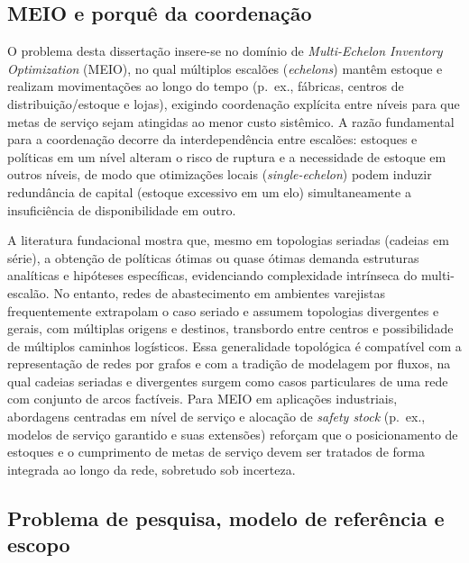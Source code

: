 \subsection{MEIO e porquê da coordenação}

O problema desta dissertação insere-se no domínio de \emph{Multi-Echelon Inventory Optimization} (MEIO), no qual múltiplos escalões (\emph{echelons}) mantêm estoque e realizam movimentações ao longo do tempo (p.\ ex., fábricas, centros de distribuição/estoque e lojas), exigindo coordenação explícita entre níveis para que metas de serviço sejam atingidas ao menor custo sistêmico. \cite{ClarkScarf1960MultiEchelon,Axsater2006InventoryControl,Zipkin2000FoundationsInventory} A razão fundamental para a coordenação decorre da interdependência entre escalões: estoques e políticas em um nível alteram o risco de ruptura e a necessidade de estoque em outros níveis, de modo que otimizações locais (\emph{single-echelon}) podem induzir redundância de capital (estoque excessivo em um elo) simultaneamente a insuficiência de disponibilidade em outro. \cite{SimchiLevi2009CadeiaSuprimentos,Chopra2022SCM}

A literatura fundacional mostra que, mesmo em topologias seriadas (cadeias em série), a obtenção de políticas ótimas ou quase ótimas demanda estruturas analíticas e hipóteses específicas, evidenciando complexidade intrínseca do multi-escalão. \cite{ClarkScarf1960MultiEchelon} No entanto, redes de abastecimento em ambientes varejistas frequentemente extrapolam o caso seriado e assumem topologias divergentes e gerais, com múltiplas origens e destinos, transbordo entre centros e possibilidade de múltiplos caminhos logísticos. Essa generalidade topológica é compatível com a representação de redes por grafos e com a tradição de modelagem por fluxos, na qual cadeias seriadas e divergentes surgem como casos particulares de uma rede com conjunto de arcos factíveis. \cite{AhujaMagnantiOrlin1993NetworkFlows,Shapiro2001ModelingSupplyChain} Para MEIO em aplicações industriais, abordagens centradas em nível de serviço e alocação de \emph{safety stock} (p.\ ex., modelos de serviço garantido e suas extensões) reforçam que o posicionamento de estoques e o cumprimento de metas de serviço devem ser tratados de forma integrada ao longo da rede, sobretudo sob incerteza. \cite{Achkar2024GSMExtensions}

\subsection{Problema de pesquisa, modelo de referência e escopo}

